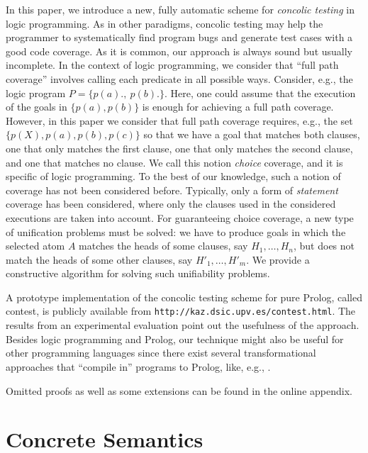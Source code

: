 \documentclass[fleqn]{tlp}
\begin{document}
In this paper, we introduce a new, fully automatic scheme for
\emph{concolic testing} in logic programming. As in other paradigms,
concolic testing may help the programmer to systematically find
program bugs and generate test cases with a good code coverage. As it
is common, our approach is always sound but usually incomplete.  In
the context of logic programming, we consider that ``full path
coverage'' involves calling each predicate in all possible
ways. Consider, e.g., the logic program $P=\{ p(a)., ~p(b).\}$. Here,
one could assume that the execution of the goals in $\{p(a),p(b)\}$ is
enough for achieving a full path coverage. However, in this paper we
consider that full path coverage requires, e.g., the set
$\{p(X),p(a),p(b),p(c)\}$ so that we have a goal that matches both
clauses, one that only matches the first clause, one that only matches
the second clause, and one that matches no clause. We call this notion
\emph{choice} coverage, and it is specific of logic programming. To
the best of our knowledge, such a notion of coverage has not been
considered before. Typically, only a form of \emph{statement} coverage
has been considered, where only the clauses used in the considered
executions are taken into account. For guaranteeing choice coverage, a
new type of unification problems must be solved:
we have to produce goals in which the selected atom $A$ matches
the heads of some clauses, say $H_1,\ldots,H_n$, but does not match
the heads of some other clauses, say $H'_1,\ldots,H'_m$.
We provide a constructive algorithm for solving such unifiability
problems.

A prototype implementation of the concolic testing scheme for pure
Prolog, called \textsf{contest}, is publicly available from
\texttt{http://kaz.dsic.upv.es/contest.html}. The results from an
experimental evaluation point out the usefulness of the
approach. Besides logic programming and Prolog, our technique might
also be useful for other programming languages since there exist
several transformational approaches that ``compile in'' programs to
Prolog, like, e.g., \cite{GZAP10}.

Omitted proofs as well as some extensions can be found in the
online appendix.

\section{Concrete Semantics} \label{concrete}
\end{document}
